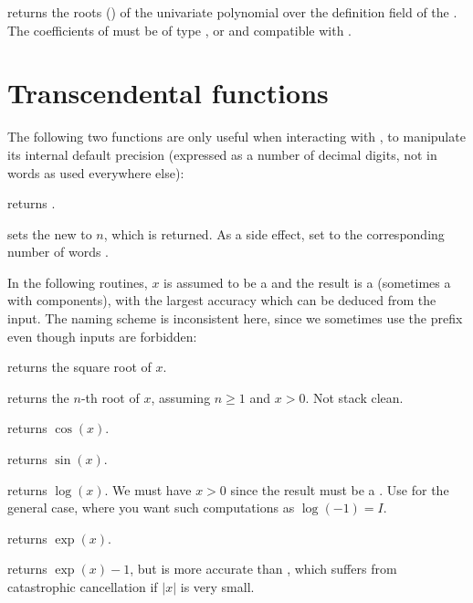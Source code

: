  returns the roots ()
of the univariate polynomial  over the definition field of the
 . The coefficients of  must be of type ,
 or  and compatible with .

\section{Transcendental functions}

The following two functions are only useful when interacting with ,
to manipulate its internal default precision (expressed as a number of
decimal digits, not in words as used everywhere else):

 returns .

 sets the new
 to $n$, which is returned. As a side effect, set
 to the corresponding number of words .


In the following routines, $x$ is assumed to be a  and the result
is a  (sometimes a  with  components), with
the largest accuracy which can be deduced from the input. The naming scheme
is inconsistent here, since we sometimes use the prefix  even though
 inputs are forbidden:

 returns the square root of $x$.

 returns the $n$-th root of $x$, assuming
$n\geq 1$ and $x > 0$. Not stack clean.

 returns $\cos(x)$.

 returns $\sin(x)$.

 returns $\log(x)$. We must have $x > 0$
since the result must be a . Use  for the general case,
where you want such computations as $\log(-1) = I$.

 returns $\exp(x)$.

 returns $\exp(x)-1$, but is more accurate than
, which suffers from catastrophic cancellation if
$|x|$ is very small.

